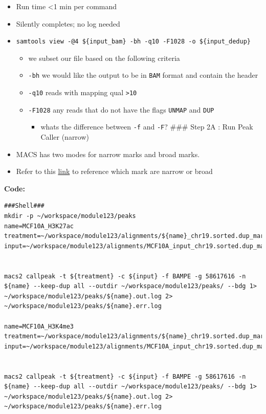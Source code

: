 \documentclass[
]{book}
\providecommand{\tightlist}{%
  \setlength{\itemsep}{0pt}\setlength{\parskip}{0pt}}
\begin{document}
\begin{itemize}
\tightlist
\item
  Run time \textless1 min per command
\item
  Silently completes; no log needed
\item
  \texttt{samtools\ view\ -@4\ \$\{input\_bam\}\ -bh\ -q10\ -F1028\ -o\ \$\{input\_dedup\}}

  \begin{itemize}
  \tightlist
  \item
    we subset our file based on the following criteria
  \item
    \texttt{-bh} we would like the output to be in \texttt{BAM} format and contain the header
  \item
    \texttt{-q10} reads with mapping qual \texttt{\textgreater{}10}
  \item
    \texttt{-F1028} any reads that do not have the flags \texttt{UNMAP} and \texttt{DUP}

    \begin{itemize}
    \tightlist
    \item
      whats the difference between \texttt{-f} and \texttt{-F}?
      \#\#\# Step 2A : Run Peak Caller (narrow)
    \end{itemize}
  \end{itemize}
\item
  MACS has two modes for narrow marks and broad marks.
\item
  Refer to this \href{https://www.encodeproject.org/chip-seq/histone/\#:~:text=must\%20pass\%20routine\%20metadata\%20audits\%20in\%20order\%20to\%20be\%20released.-,Target\%2Dspecific\%20Standards,-For\%20narrow\%2Dpeak\%20histone\%20experiments\%2C\%20each\%20replicate\%C2\%A0should\%20have\%2020}{link} to reference which mark are narrow or broad
\end{itemize}

\textbf{Code:}

\begin{verbatim}
###Shell###
mkdir -p ~/workspace/module123/peaks
name=MCF10A_H3K27ac
treatment=~/workspace/module123/alignments/${name}_chr19.sorted.dup_marked.dedup.bam
input=~/workspace/module123/alignments/MCF10A_input_chr19.sorted.dup_marked.dedup.bam


macs2 callpeak -t ${treatment} -c ${input} -f BAMPE -g 58617616 -n ${name} --keep-dup all --outdir ~/workspace/module123/peaks/ --bdg 1> ~/workspace/module123/peaks/${name}.out.log 2> ~/workspace/module123/peaks/${name}.err.log

name=MCF10A_H3K4me3
treatment=~/workspace/module123/alignments/${name}_chr19.sorted.dup_marked.dedup.bam
input=~/workspace/module123/alignments/MCF10A_input_chr19.sorted.dup_marked.dedup.bam


macs2 callpeak -t ${treatment} -c ${input} -f BAMPE -g 58617616 -n ${name} --keep-dup all --outdir ~/workspace/module123/peaks/ --bdg 1> ~/workspace/module123/peaks/${name}.out.log 2> ~/workspace/module123/peaks/${name}.err.log
\end{verbatim}
\end{document}
